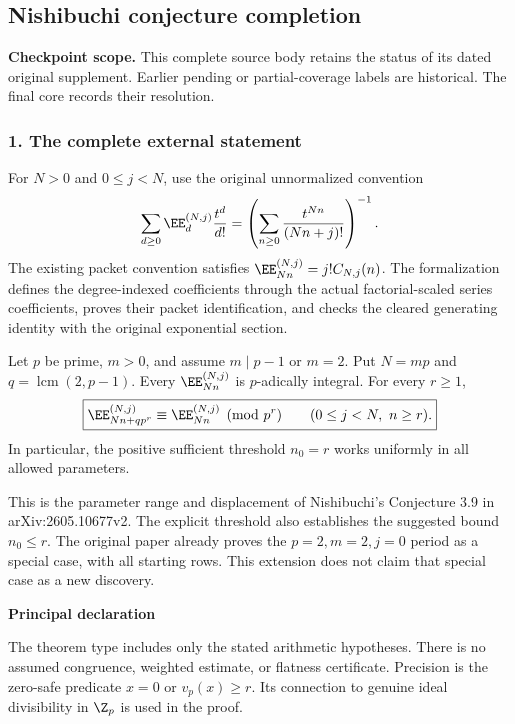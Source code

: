 \clearpage\subsection{Nishibuchi conjecture completion}\label{app:sup11}
\noindent\textbf{Checkpoint scope.} This complete source body retains the status of its dated original supplement. Earlier pending or partial-coverage labels are historical. The final core records their resolution.\par\medskip
\subsubsection*{1. The complete external statement}
For $N>0$ and $0\le j<N$, use the original unnormalized convention
\[
 \sum_{d\ge0}\EE_d^{(N,j)}\frac{t^d}{d!}
 =\left(\sum_{n\ge0}\frac{t^{Nn}}{(Nn+j)!}\right)^{-1}.
\]
The existing packet convention satisfies
$\EE_{Nn}^{(N,j)}=j!C_{N,j}(n)$. The formalization defines the degree-indexed coefficients through the actual factorial-scaled series coefficients, proves their packet identification, and checks the cleared generating identity with the original exponential section.

\begin{theorem}
Let $p$ be prime, $m>0$, and assume $m\mid p-1$ or $m=2$. Put $N=mp$ and $q=\operatorname{lcm}(2,p-1)$. Every $\EE_{Nn}^{(N,j)}$ is $p$-adically integral. For every $r\ge1$,
\[
\boxed{\EE_{Nn+qp^r}^{(N,j)}\equiv\EE_{Nn}^{(N,j)}\pmod{p^r}
       \qquad(0\le j<N,\ n\ge r).}
\]
In particular, the positive sufficient threshold $n_0=r$ works uniformly in all allowed parameters.
\end{theorem}

This is the parameter range and displacement of Nishibuchi's Conjecture 3.9 in arXiv:2605.10677v2. The explicit threshold also establishes the suggested bound $n_0\le r$. The original paper already proves the $p=2,m=2,j=0$ period as a special case, with all starting rows. This extension does not claim that special case as a new discovery.

\textbf{Principal declaration}\par
{}

The theorem type includes only the stated arithmetic hypotheses. There is no assumed congruence, weighted estimate, or flatness certificate. Precision is the zero-safe predicate $x=0$ or $v_p(x)\ge r$. Its connection to genuine ideal divisibility in $\Z_p$ is used in the proof.

